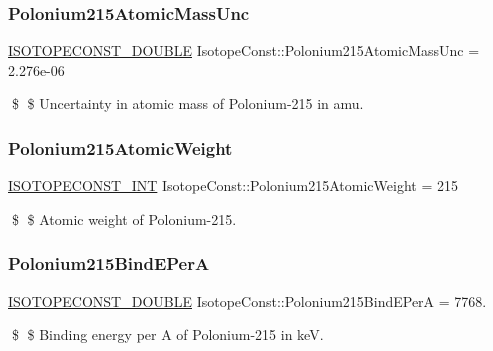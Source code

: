 \subsubsection{\texorpdfstring{Polonium215\+Atomic\+Mass\+Unc}{Polonium215AtomicMassUnc}}
{\footnotesize\ttfamily \mbox{\hyperlink{group___isotope_const-_macros_ga8f45a7272ce02c0b4c65c44636ed719a}{I\+S\+O\+T\+O\+P\+E\+C\+O\+N\+S\+T\+\_\+\+D\+O\+U\+B\+LE}} Isotope\+Const\+::\+Polonium215\+Atomic\+Mass\+Unc = 2.\+276e-\/06}

\$ \$ Uncertainty in atomic mass of Polonium-\/215 in amu. \mbox{\label{group___isotope_const-_polonium-_po215_gab13fdb68c636bf7a1716be4510303e7b}} 
\subsubsection{\texorpdfstring{Polonium215\+Atomic\+Weight}{Polonium215AtomicWeight}}
{\footnotesize\ttfamily \mbox{\hyperlink{group___isotope_const-_macros_ga5f18360b3e99483a35c32d789e62621c}{I\+S\+O\+T\+O\+P\+E\+C\+O\+N\+S\+T\+\_\+\+I\+NT}} Isotope\+Const\+::\+Polonium215\+Atomic\+Weight = 215}

\$ \$ Atomic weight of Polonium-\/215. \mbox{\label{group___isotope_const-_polonium-_po215_ga6beaade921dc7ac4827808a7bf1ddae8}} 
\subsubsection{\texorpdfstring{Polonium215\+Bind\+E\+PerA}{Polonium215BindEPerA}}
{\footnotesize\ttfamily \mbox{\hyperlink{group___isotope_const-_macros_ga8f45a7272ce02c0b4c65c44636ed719a}{I\+S\+O\+T\+O\+P\+E\+C\+O\+N\+S\+T\+\_\+\+D\+O\+U\+B\+LE}} Isotope\+Const\+::\+Polonium215\+Bind\+E\+PerA = 7768.}

\$ \$ Binding energy per A of Polonium-\/215 in keV. \mbox{\label{group___isotope_const-_polonium-_po215_gaf53fa9351a8995df62d112ebd496f276}} 
